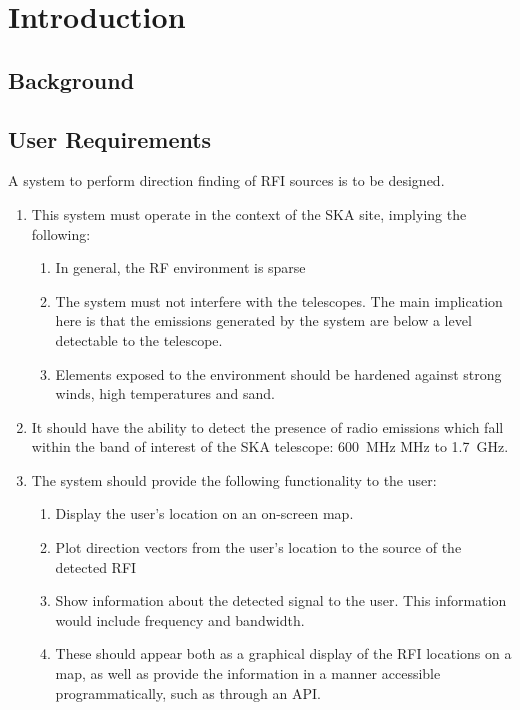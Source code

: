 \chapter{Introduction}
\section{Background}

\section{User Requirements}

A system to perform direction finding of RFI sources is to be designed.
\begin{enumerate}
  \item This system must operate in the context of the SKA site, implying the following:
  \begin{enumerate}
    \item In general, the RF environment is sparse
    \item The system must not interfere with the telescopes. The main implication here is that the emissions generated by the system are below a level detectable to the telescope. 
    \item  Elements exposed to the environment should be hardened against strong winds, high temperatures and sand.
  \end{enumerate}

  \item It should have the ability to detect the presence of radio emissions which fall within the band of interest of the SKA telescope: \SI{600}{\mega\hertz} MHz to \SI{1.7}{\giga\hertz}.
    
  \item The system should provide the following functionality to the user:
  \begin{enumerate}
    \item Display the user's location on an on-screen map.
    \item Plot direction vectors from the user's location to the source of the detected RFI
    \item Show information about the detected signal to the user. This information would include frequency and bandwidth. 
    \item These should appear both as a graphical display of the RFI locations on a map, as well as provide the information in a manner accessible programmatically, such as through an API. 
  \end{enumerate}


\end{enumerate}
